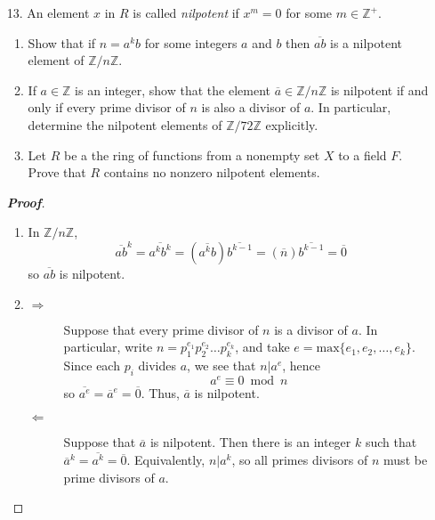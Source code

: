 \documentclass[12pt,leqno]{book}
\theoremstyle{definition}
\newcommand{\Z}{\mathbb{Z}}
\newenvironment{Proof}{\begin{proof}[\textnormal{\textbf{Proof}}]}{\end{proof}}
\begin{document}
\begin{enumerate}
\begin{Proof}
 Take $x\in C(a)$. By definition, $xa=ax$. Since $D$ is a division ring, there is an element $x^{-1}\in D$ such that $x^{-1}x=1$. Multiplying on the right by $x^{-1}$, we see that $xax^{-1}=a$. Multiplying on the left by $x^{-1}$, we see that $ax^{-1}=x^{-1}a$, so $x^{-1}\in C(a)$. In particular, every element of $C(a)$ is invertible, so $C(a)$ is a division ring.
\end{Proof}

 \item [13.] An element $x$ in $R$ is called \textit{nilpotent} if $x^m=0$ for some $m\in\Z^+$. 
    \begin{enumerate}
     \item Show that if $n=a^kb$ for some integers $a$ and $b$ then $\overline{ab}$ is a nilpotent element of $\Z/n\Z$.
     \item If $a\in\Z$ is an integer, show that the element $\overline{a}\in\Z/n\Z$ is nilpotent if and only if every prime divisor of $n$ is also a divisor of $a$. In particular, determine the nilpotent elements of $\Z/72\Z$ explicitly.
     \item Let $R$ be a the ring of functions from a nonempty set $X$ to a field $F$. Prove that $R$ contains no nonzero nilpotent elements.
    \end{enumerate}

\begin{Proof}\indent
 \begin{enumerate}
  \item In $\Z/n\Z$, \[\overline{ab}^k=\overline{a^kb^k}=\left(\overline{a^kb}\right)\overline{b^{k-1}}=(\overline{n})\overline{b^{k-1}}=\overline{0}\] so $\overline{ab}$ is nilpotent.
  \item \begin{description}
         \item [$\Rightarrow$] Suppose that every prime divisor of $n$ is a divisor of $a$. In particular, write $n=p_1^{e_1}p_2^{e_2}\hdots p_k^{e_k}$, and take $e=\text{max}\{e_1,e_2,\hdots,e_k\}$. Since each $p_i$ divides $a$, we see that $n|a^e$, hence \[a^e\equiv0\bmod{n}\] so $\overline{a^e}=\overline{a}^e=\overline{0}$. Thus, $\overline{a}$ is nilpotent.
	 \item [$\Leftarrow$] Suppose that $\overline{a}$ is nilpotent. Then there is an integer $k$ such that $\overline{a}^k=\overline{a^k}=\overline{0}$. Equivalently, $n|a^k$, so all primes divisors of $n$ must be prime divisors of $a$.


\end{description}
\end{enumerate}
\end{Proof}
\end{enumerate}
\end{document}
